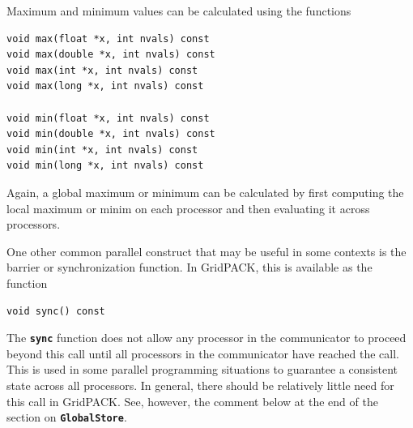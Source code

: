 Maximum and minimum values can be calculated using the functions

{
\color{red}
\begin{Verbatim}[fontseries=b]
void max(float *x, int nvals) const
void max(double *x, int nvals) const
void max(int *x, int nvals) const
void max(long *x, int nvals) const

void min(float *x, int nvals) const
void min(double *x, int nvals) const
void min(int *x, int nvals) const
void min(long *x, int nvals) const
\end{Verbatim}
}

Again, a global maximum or minimum can be calculated by first computing the local maximum or minim on each processor and then evaluating it across processors. 

One other common parallel construct that may be useful in some contexts is the barrier or synchronization function. In GridPACK, this is available as the function

{
\color{red}
\begin{Verbatim}[fontseries=b]
void sync() const
\end{Verbatim}
}

The \texttt{\textbf{sync}} function does not allow any processor in the communicator to proceed beyond this call until all processors in the communicator have reached the call. This is used in some parallel programming situations to guarantee a consistent state across all processors.  In general, there should be relatively little need for this call in GridPACK. See, however, the comment below at the end of the section on \texttt{\textbf{GlobalStore}}.
